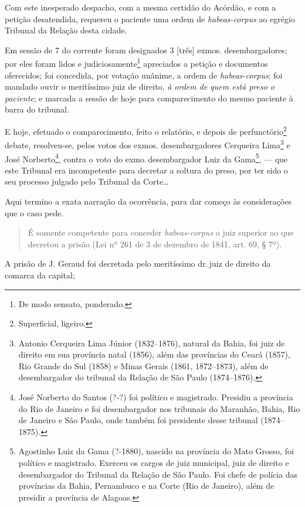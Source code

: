 Com este inesperado despacho, com a mesma certidão do Acórdão, e com a
petição desatendida, requereu o paciente uma ordem de
\emph{habeas-corpus} ao egrégio Tribunal da Relação desta cidade.

Em sessão de 7 do corrente foram designados 3 {[}três{]} exmos.
desembargadores; por eles foram lidos e judiciosamente\footnote{ De
  modo sensato, ponderado.} apreciados a petição e documentos
oferecidos; foi concedida, por votação unânime, a ordem de
\emph{habeas-corpus}; foi mandado ouvir o meritíssimo juiz de direito,
\emph{à ordem de quem está preso o paciente}; e marcada a sessão de hoje
para comparecimento do mesmo paciente à barra do tribunal.

E hoje, efetuado o comparecimento, feito o relatório, e depois de
perfunctório\footnote{ Superficial, ligeiro.} debate, resolveu-se,
pelos votos dos exmos. desembargadores Cerqueira Lima\footnote{ Antonio
  Cerqueira Lima Júnior (1832--1876), natural da Bahia, foi juiz de
  direito em sua província natal (1856), além das províncias do Ceará
  (1857), Rio Grande do Sul (1858) e Minas Gerais (1861, 1872--1873),
  além de desembargador do tribunal da Relação de São Paulo (1874--1876).}
e José Norberto\footnote{ José Norberto do Santos (?-?) foi político e
  magistrado. Presidiu a província do Rio de Janeiro e foi desembargador
  nos tribunais do Maranhão, Bahia, Rio de Janeiro e São Paulo, onde
  também foi presidente desse tribunal (1874--1875).}, contra o voto do
exmo.\,desembargador Luiz da Gama\footnote{ Agostinho Luiz da Gama
  (?-1880), nascido na província do Mato Grosso, foi político e
  magistrado. Exerceu os cargos de juiz municipal, juiz de direito e
  desembargador do Tribunal da Relação de São Paulo. Foi chefe de
  polícia das províncias da Bahia, Pernambuco e na Corte (Rio de
  Janeiro), além de presidir a província de Alagoas.}, --- que este
Tribunal era incompetente para decretar a soltura do preso, por ter sido
o seu processo julgado pelo Tribunal da Corte\ldots{}

Aqui termino a exata narração da ocorrência, para dar começo às
considerações que o caso pede.

\begin{quote}
É somente competente para conceder \emph{habeas-corpus} o juiz
superior ao que decretou a prisão
(Lei nº 261 de 3 de dezembro de 1841, art. 69, § 7º).
\end{quote}

A prisão de J. Geraud foi decretada pelo meritíssimo dr.\,juiz de direito
da comarca da capital;

